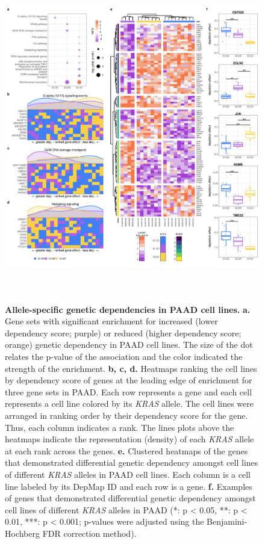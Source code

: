 \documentclass[english, 12pt, letterpaper]{article}
\newcommand{\KRAS}{\emph{KRAS}}
\begin{document}
\begin{figure}
\centering
\includegraphics[height=145mm]{figures/SuppFigure_13.jpeg}
\caption{
    \textbf{Allele-specific genetic dependencies in PAAD cell lines.}
    \textbf{a.} Gene sets with significant enrichment for increased (lower dependency score; purple) or reduced (higher dependency score; orange) genetic dependency in PAAD cell lines. The size of the dot relates the p-value of the association and the color indicated the strength of the enrichment.
    \textbf{b, c, d.} Heatmaps ranking the cell lines by dependency score of genes at the leading edge of enrichment for three gene sets in PAAD. Each row represents a gene and each cell represents a cell line colored by its \KRAS{} allele. The cell lines were arranged in ranking order by their dependency score for the gene. Thus, each column indicates a rank. The lines plots above the heatmaps indicate the representation (density) of each \KRAS{} allele at each rank across the genes.
    \textbf{e.} Clustered heatmaps of the genes that demonstrated differential genetic dependency amongst cell lines of different \KRAS{} alleles in PAAD cell lines. Each column is a cell line labeled by its DepMap ID and each row is a gene.
    \textbf{f.} Examples of genes that demonstrated differential genetic dependency amongst cell lines of different \KRAS{} alleles in PAAD (*: p < 0.05, **: p < 0.01, ***: p < 0.001; p-values were adjusted using the Benjamini-Hochberg FDR correction method).
}
\label{sfig:paad-dependency-main}
\end{figure}
\end{document}
